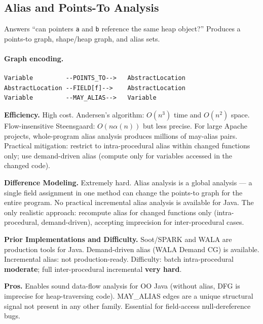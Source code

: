 \documentclass[12pt,a4paper]{article}
\begin{document}
\subsection{Alias and Points-To Analysis}
\label{sec:alias}

Answers ``can pointers \texttt{a} and \texttt{b} reference the same heap
object?'' Produces a points-to graph, shape/heap graph, and alias sets.

\paragraph{Graph encoding.}
\begin{lstlisting}
Variable         --POINTS_TO-->   AbstractLocation
AbstractLocation --FIELD[f]-->    AbstractLocation
Variable         --MAY_ALIAS-->   Variable
\end{lstlisting}

\begin{effbox}
\textbf{Efficiency.}
High cost. Andersen's algorithm: $O(n^3)$ time and $O(n^2)$ space. Flow-insensitive
Steensgaard: $O(n \alpha(n))$ but less precise. For large Apache projects,
whole-program alias analysis produces millions of may-alias pairs. Practical
mitigation: restrict to intra-procedural alias within changed functions only;
use demand-driven alias (compute only for variables accessed in the changed
code).
\end{effbox}

\begin{diffbox}
\textbf{Difference Modeling.}
Extremely hard. Alias analysis is a global analysis --- a single field
assignment in one method can change the points-to graph for the entire program.
No practical incremental alias analysis is available for Java. The only
realistic approach: recompute alias for changed functions only
(intra-procedural, demand-driven), accepting imprecision for inter-procedural
cases.
\end{diffbox}

\begin{implbox}
\textbf{Prior Implementations and Difficulty.}
Soot/SPARK and WALA are production tools for Java. Demand-driven alias (WALA
Demand CG) is available. Incremental alias: not production-ready.
Difficulty: batch intra-procedural \textbf{moderate}; full
inter-procedural incremental \textbf{very hard}.
\end{implbox}

\begin{prosbox}
\textbf{Pros.}
Enables sound data-flow analysis for OO Java (without alias, DFG is imprecise
for heap-traversing code). MAY\_ALIAS edges are a unique structural signal not
present in any other family. Essential for field-access null-dereference bugs.
\end{prosbox}
\end{document}
